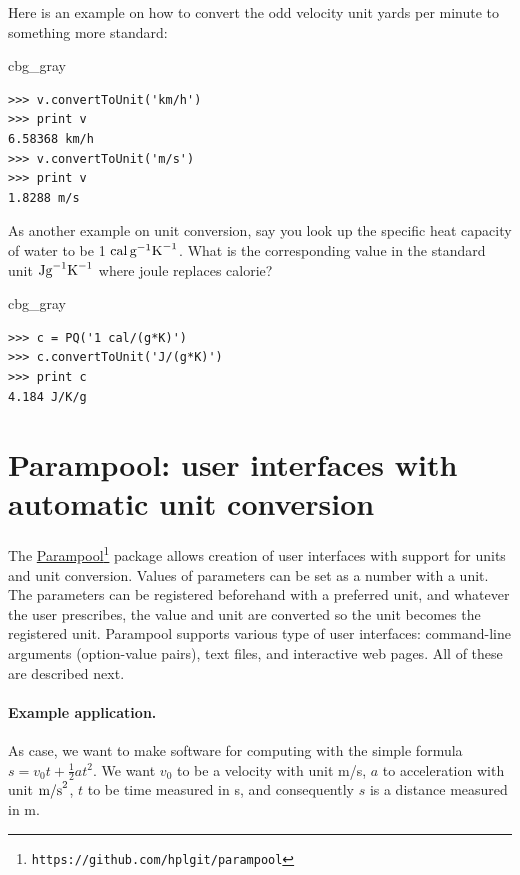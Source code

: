 \documentclass[graybox,envcountchap,sectrefs,final]{svmonodo}
\newenvironment{_cod_tight}[1]{
   \def\FrameCommand{\colorbox{#1}}
   \FrameRule0.6pt\MakeFramed {\FrameRestore}\vskip3mm}
   {\vskip0mm\endMakeFramed}
\newenvironment{cod}[1]{
\bgroup\rmfamily
\fboxsep=0mm\relax
\begin{_cod_tight}{#1}
\list{}{\parsep=-2mm\parskip=0mm\topsep=0pt\leftmargin=2mm
\rightmargin=2\leftmargin\leftmargin=4pt\relax}
\item\relax}
{\endlist\end{_cod_tight}\egroup}
\begin{document}
Here is an example on how to convert the odd velocity unit yards per
minute to something more standard:

\begin{cod}{cbg_gray}\begin{Verbatim}[numbers=none,fontsize=\fontsize{9pt}{9pt},baselinestretch=0.95,xleftmargin=2mm]
>>> v.convertToUnit('km/h')
>>> print v
6.58368 km/h
>>> v.convertToUnit('m/s')
>>> print v
1.8288 m/s
\end{Verbatim}
\end{cod}
\noindent

As another example on unit conversion,
say you look up the specific heat capacity of water to
be 1 $\hbox{cal}\, \hbox{g}^{-1}\hbox{K}^{-1}$. What is the
corresponding value in the standard unit $\hbox{Jg}^{-1}\hbox{K}^{-1}$
where joule replaces calorie?

\begin{cod}{cbg_gray}\begin{Verbatim}[numbers=none,fontsize=\fontsize{9pt}{9pt},baselinestretch=0.95,xleftmargin=2mm]
>>> c = PQ('1 cal/(g*K)')
>>> c.convertToUnit('J/(g*K)')
>>> print c
4.184 J/K/g
\end{Verbatim}
\end{cod}
\noindent

\section{Parampool: user interfaces with automatic unit conversion}
\label{scale:parampool}


The \href{{https://github.com/hplgit/parampool}}{Parampool}\footnote{\texttt{https://github.com/hplgit/parampool}} package allows
creation of user interfaces with support for units and unit
conversion. Values of parameters can be set as a number with a
unit. The parameters can be registered beforehand with a preferred
unit, and whatever the user prescribes, the value and unit are
converted so the unit becomes the registered unit. Parampool supports
various type of user interfaces: command-line arguments (option-value
pairs), text files, and interactive web pages. All of these
are described next.

\paragraph{Example application.}
As case, we want to make software for computing with the simple
formula $s=v_0t + \frac{1}{2}at^2$. We want $v_0$ to be a velocity
with unit m/s, $a$ to acceleration with unit $\hbox{m/s}^2$, $t$ to be
time measured in s, and consequently $s$ is a distance measured in m.
\end{document}
